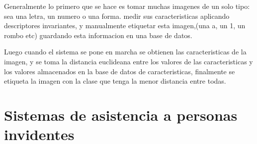 \documentclass{article}
\begin{document}
	Generalmente lo primero que se hace es tomar muchas imagenes de un solo tipo: sea una letra, un numero o una forma. medir sus caracteristicas aplicando
	descriptores invariantes, y manualmente etiquetar esta imagen,(una a, un 1, un rombo etc) guardando esta informacion en una base de datos. 
	
	Luego cuando el sistema se pone en marcha se obtienen las caracteristicas de la imagen, y se toma la distancia euclideana entre los valores de las caracteristicas
	y los valores almacenados en la base de datos de caracteristicas, finalmente se etiqueta la imagen con la clase que tenga la menor distancia entre todas.
		
	
	\section{Sistemas de asistencia a personas invidentes}
	


\end{document}
